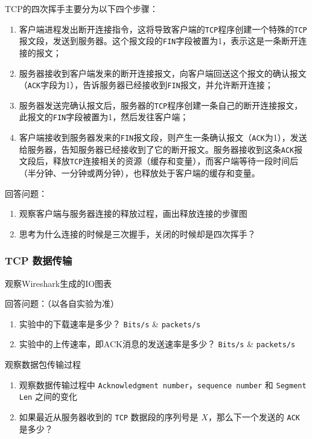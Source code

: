 \documentclass{article}
\begin{document}
TCP的四次挥手主要分为以下四个步骤：
\begin{enumerate}[noitemsep]
  \item 客户端进程发出断开连接指令，这将导致客户端的\texttt{TCP}程序创建一个特殊的\texttt{TCP}报文段，发送到服务器。这个报文段的\texttt{FIN}字段被置为1，表示这是一条断开连接的报文；
  \item 服务器接收到客户端发来的断开连接报文，向客户端回送这个报文的确认报文（\texttt{ACK}字段为1），告诉服务器已经接收到\texttt{FIN}报文，并允许断开连接；
  \item 服务器发送完确认报文后，服务器的\texttt{TCP}程序创建一条自己的断开连接报文，此报文的\texttt{FIN}字段被置为1，然后发往客户端；
  \item 客户端接收到服务器发来的\texttt{FIN}报文段，则产生一条确认报文（\texttt{ACK}为1），发送给服务器，告知服务器已经接收到了它的断开报文。服务器接收到这条\texttt{ACK}报文段后，释放\texttt{TCP}连接相关的资源（缓存和变量），而客户端等待一段时间后（半分钟、一分钟或两分钟），也释放处于客户端的缓存和变量。
\end{enumerate}

回答问题：
\begin{enumerate}[noitemsep]
  \item 观察客户端与服务器连接的释放过程，画出释放连接的步骤图
  \item 思考为什么连接的时候是三次握手，关闭的时候却是四次挥手？
\end{enumerate}

\subsubsection{TCP 数据传输}

观察Wireshark生成的IO图表

回答问题：（以各自实验为准）
\begin{enumerate}[label={\arabic*）}, noitemsep]
  \item 实验中的下载速率是多少？ \texttt{Bits/s} \& \texttt{packets/s}
  \item 实验中的上传速率，即ACK消息的发送速率是多少？ \texttt{Bits/s} \& \texttt{packets/s}
\end{enumerate}

观察数据包传输过程

\begin{enumerate}[noitemsep]
  \item 观察数据传输过程中 \texttt{Acknowledgment number}，\texttt{sequence number} 和 \texttt{Segment Len} 之间的变化
  \item 如果最近从服务器收到的 \texttt{TCP} 数据段的序列号是 $X$，那么下一个发送的 \texttt{ACK} 是多少？
\end{enumerate}
\end{document}
